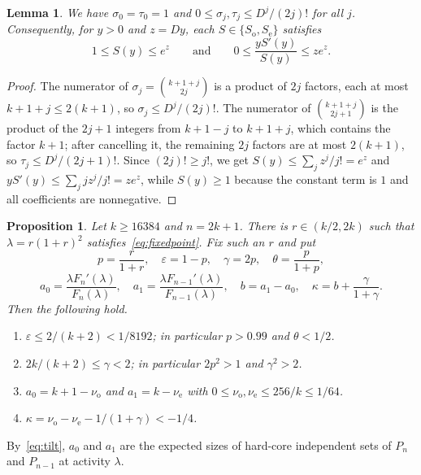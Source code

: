 \documentclass{amsart}
\newtheorem{proposition}[theorem]{Proposition}
\newtheorem{lemma}[theorem]{Lemma}
\theoremstyle{definition}
\theoremstyle{remark}
\numberwithin{equation}{section}
\newcommand{\eps}{\varepsilon}
\newcommand{\nuo}{\nu_{\mathrm{o}}}
\newcommand{\nue}{\nu_{\mathrm{e}}}
\begin{document}
\begin{lemma}\label{lem:reverse}
We have $\sigma_0=\tau_0=1$ and $0\le\sigma_j,\tau_j\le D^j/(2j)!$ for all $j$. Consequently, for $y>0$ and $z=Dy$, each $S\in\{S_{\mathrm o},S_{\mathrm e}\}$ satisfies
\[
1\le S(y)\le e^z\qquad\text{and}\qquad 0\le \frac{yS'(y)}{S(y)}\le ze^z .
\]
\end{lemma}

\begin{proof}
The numerator of $\sigma_j=\binom{k+1+j}{2j}$ is a product of $2j$ factors, each at most $k+1+j\le2(k+1)$, so $\sigma_j\le D^j/(2j)!$. The numerator of $\binom{k+1+j}{2j+1}$ is the product of the $2j+1$ integers from $k+1-j$ to $k+1+j$, which contains the factor $k+1$; after cancelling it, the remaining $2j$ factors are at most $2(k+1)$, so $\tau_j\le D^j/(2j+1)!$. Since $(2j)!\ge j!$, we get $S(y)\le\sum_jz^j/j!=e^z$ and $yS'(y)\le\sum_j jz^j/j!=ze^z$, while $S(y)\ge1$ because the constant term is $1$ and all coefficients are nonnegative.
\end{proof}

\begin{proposition}\label{prop:tuning}
Let $k\ge16384$ and $n=2k+1$. There is $r\in(k/2,2k)$ such that $\lambda=r(1+r)^2$ satisfies~\eqref{eq:fixedpoint}. Fix such an $r$ and put
\[
p=\frac{r}{1+r},\quad \eps=1-p,\quad \gamma=2p,\quad \theta=\frac{p}{1+p},
\]
\[
a_0=\frac{\lambda F_n'(\lambda)}{F_n(\lambda)},\quad a_1=\frac{\lambda F_{n-1}'(\lambda)}{F_{n-1}(\lambda)},\quad b=a_1-a_0,\quad \kappa=b+\frac{\gamma}{1+\gamma}.
\]
Then the following hold.
\begin{enumerate}[label=\textup{(\roman*)},leftmargin=*]
\item $\eps\le2/(k+2)<1/8192$; in particular $p>0.99$ and $\theta<1/2$.
\item $2k/(k+2)\le\gamma<2$; in particular $2p^2>1$ and $\gamma^2>2$.
\item $a_0=k+1-\nuo$ and $a_1=k-\nue$ with $0\le\nuo,\nue\le256/k\le1/64$.
\item $\kappa=\nuo-\nue-1/(1+\gamma)<-1/4$.
\end{enumerate}
\end{proposition}

By~\eqref{eq:tilt}, $a_0$ and $a_1$ are the expected sizes of hard-core independent sets of $P_n$ and $P_{n-1}$ at activity $\lambda$.
\end{document}
